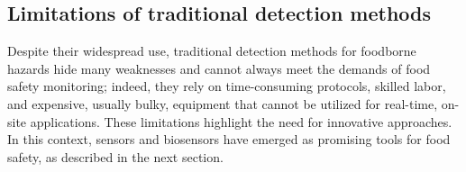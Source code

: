 \subsection{Limitations of traditional detection methods}
\label{sec:limitations_traditional}

Despite their widespread use, traditional detection methods for foodborne
hazards hide many weaknesses and cannot always meet the demands of food safety
monitoring; indeed, they rely on time-consuming protocols, skilled labor, and
expensive, usually bulky, equipment that cannot be utilized for real-time,
on-site applications. These limitations highlight the need for innovative
approaches. In this context, sensors and biosensors have emerged as promising
tools for food safety, as described in the next section.

